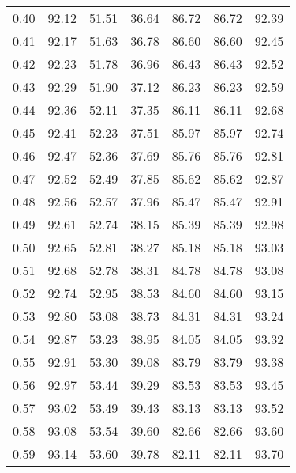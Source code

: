 \begin{tabular}{|c|c|c|c|c|c|c|}
      0.40 &     92.12 &     51.51 &      36.64 &   86.72 &      86.72 &         92.39 \\
      0.41 &     92.17 &     51.63 &      36.78 &   86.60 &      86.60 &         92.45 \\
      0.42 &     92.23 &     51.78 &      36.96 &   86.43 &      86.43 &         92.52 \\
      0.43 &     92.29 &     51.90 &      37.12 &   86.23 &      86.23 &         92.59 \\
      0.44 &     92.36 &     52.11 &      37.35 &   86.11 &      86.11 &         92.68 \\
      0.45 &     92.41 &     52.23 &      37.51 &   85.97 &      85.97 &         92.74 \\
      0.46 &     92.47 &     52.36 &      37.69 &   85.76 &      85.76 &         92.81 \\
      0.47 &     92.52 &     52.49 &      37.85 &   85.62 &      85.62 &         92.87 \\
      0.48 &     92.56 &     52.57 &      37.96 &   85.47 &      85.47 &         92.91 \\
      0.49 &     92.61 &     52.74 &      38.15 &   85.39 &      85.39 &         92.98 \\
      0.50 &     92.65 &     52.81 &      38.27 &   85.18 &      85.18 &         93.03 \\
      0.51 &     92.68 &     52.78 &      38.31 &   84.78 &      84.78 &         93.08 \\
      0.52 &     92.74 &     52.95 &      38.53 &   84.60 &      84.60 &         93.15 \\
      0.53 &     92.80 &     53.08 &      38.73 &   84.31 &      84.31 &         93.24 \\
      0.54 &     92.87 &     53.23 &      38.95 &   84.05 &      84.05 &         93.32 \\
      0.55 &     92.91 &     53.30 &      39.08 &   83.79 &      83.79 &         93.38 \\
      0.56 &     92.97 &     53.44 &      39.29 &   83.53 &      83.53 &         93.45 \\
      0.57 &     93.02 &     53.49 &      39.43 &   83.13 &      83.13 &         93.52 \\
      0.58 &     93.08 &     53.54 &      39.60 &   82.66 &      82.66 &         93.60 \\
      0.59 &     93.14 &     53.60 &      39.78 &   82.11 &      82.11 &         93.70 \\

\end{tabular}

